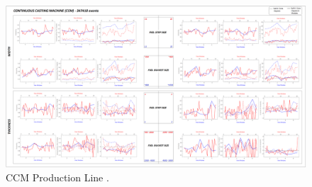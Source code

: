 \begin{landscape}
\begin{figure}[ht]
	\centering
	\includegraphics[width=1.35\textwidth]{../images/supplements-CCM_real_life_events_analysis-results-curves_and_time_resolutions.png}
	\caption{CCM Production Line \cc{} \dd{}.}
	\label{figure-supplements-CCM-curveplots_sliding}
\end{figure}
\end{landscape}